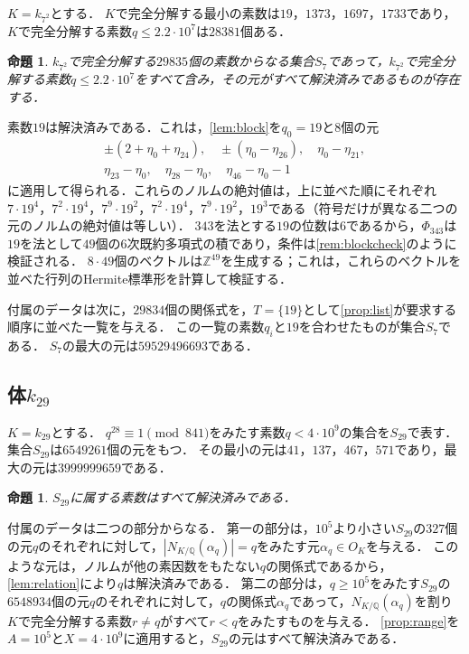 \documentclass[11pt,a4paper]{ltjsarticle}
\makeatletter
\theoremstyle{ja}
\newtheorem{proposition}[theorem]{命題}
\renewenvironment{proof}[1][証明]{\par
  \pushQED{\qed}\normalfont \topsep6\p@\@plus6\p@\relax
  \trivlist
  \item[\hskip\labelsep\bfseries #1]\hspace{1\zw}\ignorespaces
}{\popQED\endtrivlist\@endpefalse}
\makeatother
\begin{document}
$K = k_{7^2}$とする．
$K$で完全分解する最小の素数は$19$，$1373$，$1697$，$1733$であり，$K$で完全分解する素数$q \le 2.2 \cdot 10^7$は$28381$個ある．

\begin{proposition} \label{prop:data7}
$k_{7^2}$で完全分解する$29835$個の素数からなる集合$S_7$であって，$k_{7^2}$で完全分解する素数$q \le 2.2 \cdot 10^7$をすべて含み，その元がすべて解決済みであるものが存在する．
\end{proposition}

\begin{proof}
素数$19$は解決済みである．これは，\cref{lem:block}を$q_0 = 19$と8個の元
\begin{gather*}
\pm(2 + \eta_0 + \eta_{24}), \quad \pm(\eta_0 - \eta_{26}), \quad \eta_0 - \eta_{21}, \\
\eta_{23} - \eta_0, \quad \eta_{28} - \eta_0, \quad \eta_{46} - \eta_0 - 1
\end{gather*}
に適用して得られる．これらのノルムの絶対値は，上に並べた順にそれぞれ$7 \cdot 19^4$，$7^2 \cdot 19^4$，$7^9 \cdot 19^2$，$7^2 \cdot 19^4$，$7^9 \cdot 19^2$，$19^3$である（符号だけが異なる二つの元のノルムの絶対値は等しい）．
$343$を法とする$19$の位数は$6$であるから，$\Phi_{343}$は$19$を法として$49$個の$6$次既約多項式の積であり，条件は\cref{rem:blockcheck}のように検証される．
$8 \cdot 49$個のベクトルは$\mathbb{Z}^{49}$を生成する；これは，これらのベクトルを並べた行列のHermite標準形を計算して検証する．

付属のデータは次に，$29834$個の関係式を，$T = \{19\}$として\cref{prop:list}が要求する順序に並べた一覧を与える．
この一覧の素数$q_i$と$19$を合わせたものが集合$S_7$である．
$S_7$の最大の元は$59529496693$である．
\end{proof}

\subsection{体$k_{29}$}

$K = k_{29}$とする．
$q^{28} \equiv 1 \pmod{841}$をみたす素数$q < 4 \cdot 10^9$の集合を$S_{29}$で表す．
集合$S_{29}$は$6549261$個の元をもつ．
その最小の元は$41$，$137$，$467$，$571$であり，最大の元は$3999999659$である．

\begin{proposition} \label{prop:data29}
$S_{29}$に属する素数はすべて解決済みである．
\end{proposition}

\begin{proof}
付属のデータは二つの部分からなる．
第一の部分は，$10^5$より小さい$S_{29}$の$327$個の元$q$のそれぞれに対して，$|N_{K/\mathbb{Q}}(\alpha_q)| = q$をみたす元$\alpha_q \in O_K$を与える．
このような元は，ノルムが他の素因数をもたない$q$の関係式であるから，\cref{lem:relation}により$q$は解決済みである．
第二の部分は，$q \ge 10^5$をみたす$S_{29}$の$6548934$個の元$q$のそれぞれに対して，$q$の関係式$\alpha_q$であって，$N_{K/\mathbb{Q}}(\alpha_q)$を割り$K$で完全分解する素数$r \ne q$がすべて$r < q$をみたすものを与える．
\cref{prop:range}を$A = 10^5$と$X = 4 \cdot 10^9$に適用すると，$S_{29}$の元はすべて解決済みである．
\end{proof}
\end{document}
